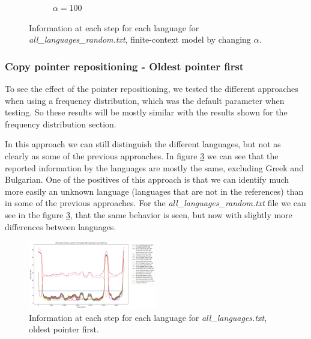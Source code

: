 \documentclass{article}
\begin{document}
\begin{figure}
\begin{subfigure}[b]{0.3\textwidth}
\begin{center}
        \end{center}
        \caption{$\alpha = 100$}
        \label{fig:all_languages_random_p_c:100:3}
    \end{subfigure}
    
    \caption{Information at each step for each language for \textit{all\_languages\_random.txt}, finite-context model by changing $\alpha$.}
    \label{fig:all_languages_random_p_c:alpha}
\end{figure}

\subsubsection{Copy pointer repositioning - Oldest pointer first}
\label{subsubsec:results_locate_lang_oldest_pointer_first}

To see the effect of the pointer repositioning, we tested the different approaches when using a frequency distribution, which was the default parameter when testing.
So these results will be mostly similar with the results shown for the frequency distribution section.

In this approach we can still distinguish the different languages, but not as clearly as some of the previous approaches.
In figure \ref{fig:all_languages_r_o} we can see that the reported information by the languages are mostly the same, excluding Greek and Bulgarian.
One of the positives of this approach is that we can identify much more easily an unknown language (languages that are not in the references) than in some of the previous approaches. %
For the \textit{all\_languages\_random.txt} file we can see in the figure \ref{fig:all_languages_r_o}, that the same behavior is seen, but now with slightly more differences between languages.


\begin{figure}
    \centering
    \includegraphics[width=0.5\textwidth]{../results/all_languages/-r_o.png}
    \caption{Information at each step for each language for \textit{all\_languages.txt}, oldest pointer first.}
    \label{fig:all_languages_r_o}
\end{figure}
\end{document}
